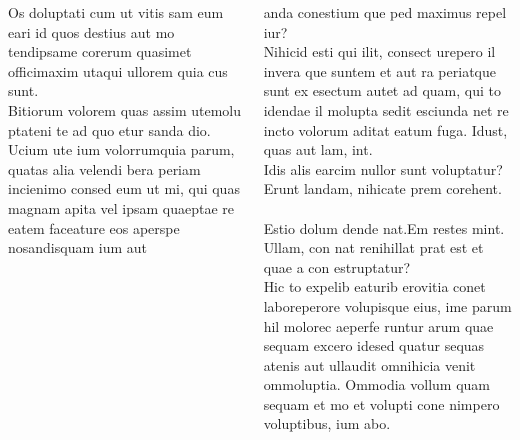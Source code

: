 \documentclass{beamer}
\begin{document}
\begin{frame}[t]
\begin{columns}[onlytextwidth]
\begin{column}{.49\linewidth}
      Os doluptati cum ut vitis sam eum eari id quos destius aut mo
      tendipsame corerum quasimet officimaxim utaqui ullorem quia cus
      sunt.\\[1ex]

      Bitiorum volorem quas assim utemolu ptateni te ad quo etur sanda
      dio. Ucium ute ium volorrumquia parum, quatas alia velendi bera
      periam incienimo consed eum ut mi, qui quas magnam apita vel
      ipsam quaeptae re eatem faceature eos aperspe nosandisquam ium
      aut
    \end{column}
    \begin{column}{.49\linewidth}
      anda conestium que ped maximus repel iur?\\[1ex]

      Nihicid esti qui ilit, consect urepero il invera que suntem et
      aut ra periatque sunt ex esectum autet ad quam, qui to idendae
      il molupta sedit esciunda net re incto volorum aditat eatum
      fuga. Idust, quas aut lam, int.\\[1ex]

      Idis alis earcim nullor sunt voluptatur? Erunt landam, nihicate
      prem corehent.\\[2ex]

      \\
      Estio dolum dende nat.Em restes mint.\\
      Ullam, con nat renihillat prat est et quae a con estruptatur?\\[1ex]

      Hic to expelib eaturib erovitia conet laboreperore volupisque
      eius, ime parum hil molorec aeperfe runtur arum quae sequam
      excero idesed quatur sequas atenis aut ullaudit omnihicia venit
      ommoluptia. Ommodia vollum quam sequam et mo et volupti cone
      nimpero voluptibus, ium abo.
    \end{column}
  \end{columns}

  \vspace*{1.5ex}

\end{frame}
\end{document}
